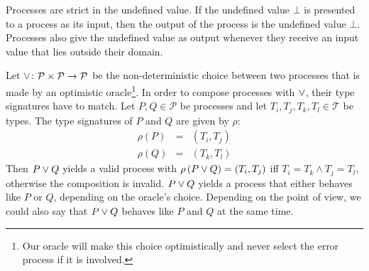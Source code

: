 
\begin{definition}
\label{def:process_strictness}
Processes are strict in the undefined value. If the undefined value $\bot$ is presented to a process as its input, then the output of the process is the undefined value $\bot$. Processes also give the undefined value as output whenever they receive an input value that lies outside their domain.

\hfill\qedsymbol
\end{definition}


\begin{definition}
\label{def:static_choice}
Let $\vee \colon \mathcal{P} \times \mathcal{P} \to \mathcal{P}$ be the non-deterministic choice between two processes that is made by an optimistic oracle\footnote{Our oracle will make this choice optimistically and never select the error process if it is involved.}. In order to compose processes with $\vee$, their type signatures have to match. Let $P, Q \in \mathcal{P}$ be processes and let $T_i, T_j, T_k, T_l \in \mathcal{T}$ be types. The type signatures of $P$ and $Q$ are given by $\rho$:
\begin{eqnarray}
  \rho \left( P \right) & = & \left( T_i, T_j \right) \\
  \rho \left( Q \right) & = & \left( T_k, T_l \right)
\end{eqnarray}
Then $P \vee Q$ yields a valid process with $\rho \left( P \vee Q \right) = \left( T_i, T_j \right)$ iff $T_i = T_k \wedge T_j = T_l$, otherwise the composition is invalid. $P \vee Q$ yields a process that either behaves like $P$ or $Q$, depending on the oracle's choice. Depending on the point of view, we could also say that $P \vee Q$ behaves like $P$ and $Q$ at the same time.

\hfill\qedsymbol
\end{definition}



